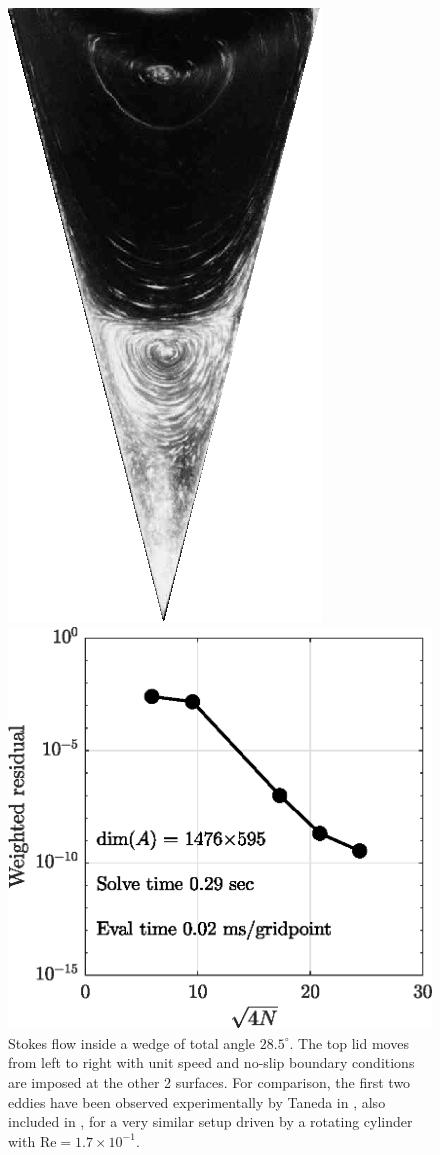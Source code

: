 \begin{figure}[H]
\begin{minipage}{0.45\linewidth}
		\includegraphics[width=0.6\linewidth]{Figures/wedge_exp}
	\end{minipage}

	\includegraphics[width=0.5\linewidth]{Figures/wedge_conv}
	
	
	\label{fig:wedge}
	\caption{Stokes flow inside a wedge of total angle $28.5^\circ$. The top lid moves from left to right with unit speed and no-slip boundary conditions are imposed at the other 2 surfaces. For comparison, the first two eddies have been observed experimentally by Taneda in \cite[Fig.~19]{taneda79}, also included in \cite[Fig.~10]{vandyke82}, for a very similar setup driven by a rotating cylinder with $\text{Re}=1.7\times10^{-1}$.}
\end{figure} 

